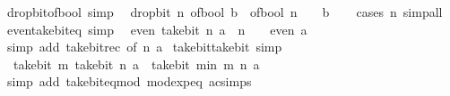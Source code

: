 \begin{isabellebody}
\ drop{\isacharunderscore}{\kern0pt}bit{\isacharunderscore}{\kern0pt}of{\isacharunderscore}{\kern0pt}bool\ {\isacharbrackleft}{\kern0pt}simp{\isacharbrackright}{\kern0pt}{\isacharcolon}{\kern0pt}\isanewline
\ \ {\isachardoublequoteopen}drop{\isacharunderscore}{\kern0pt}bit\ n\ {\isacharparenleft}{\kern0pt}of{\isacharunderscore}{\kern0pt}bool\ b{\isacharparenright}{\kern0pt}\ {\isacharequal}{\kern0pt}\ of{\isacharunderscore}{\kern0pt}bool\ {\isacharparenleft}{\kern0pt}n\ {\isacharequal}{\kern0pt}\ {}\ {\isasymand}\ b{\isacharparenright}{\kern0pt}{\isachardoublequoteclose}\isanewline
%
\isadelimproof
\ \ %
\endisadelimproof
%
\isatagproof
{}\isamarkupfalse%
\ {\isacharparenleft}{\kern0pt}cases\ n{\isacharparenright}{\kern0pt}\ simp{\isacharunderscore}{\kern0pt}all%
\endisatagproof
{\isafoldproof}%
%
\isadelimproof
\isanewline
%
\endisadelimproof
\isanewline
{}\isamarkupfalse%
\ even{\isacharunderscore}{\kern0pt}take{\isacharunderscore}{\kern0pt}bit{\isacharunderscore}{\kern0pt}eq\ {\isacharbrackleft}{\kern0pt}simp{\isacharbrackright}{\kern0pt}{\isacharcolon}{\kern0pt}\isanewline
\ \ {\isacartoucheopen}even\ {\isacharparenleft}{\kern0pt}take{\isacharunderscore}{\kern0pt}bit\ n\ a{\isacharparenright}{\kern0pt}\ {\isasymlongleftrightarrow}\ n\ {\isacharequal}{\kern0pt}\ {}\ {\isasymor}\ even\ a{\isacartoucheclose}\isanewline
%
\isadelimproof
\ \ %
\endisadelimproof
%
\isatagproof
{}\isamarkupfalse%
\ {\isacharparenleft}{\kern0pt}simp\ add{\isacharcolon}{\kern0pt}\ take{\isacharunderscore}{\kern0pt}bit{\isacharunderscore}{\kern0pt}rec\ {\isacharbrackleft}{\kern0pt}of\ n\ a{\isacharbrackright}{\kern0pt}{\isacharparenright}{\kern0pt}%
\endisatagproof
{\isafoldproof}%
%
\isadelimproof
\isanewline
%
\endisadelimproof
\isanewline
{}\isamarkupfalse%
\ take{\isacharunderscore}{\kern0pt}bit{\isacharunderscore}{\kern0pt}take{\isacharunderscore}{\kern0pt}bit\ {\isacharbrackleft}{\kern0pt}simp{\isacharbrackright}{\kern0pt}{\isacharcolon}{\kern0pt}\isanewline
\ \ {\isachardoublequoteopen}take{\isacharunderscore}{\kern0pt}bit\ m\ {\isacharparenleft}{\kern0pt}take{\isacharunderscore}{\kern0pt}bit\ n\ a{\isacharparenright}{\kern0pt}\ {\isacharequal}{\kern0pt}\ take{\isacharunderscore}{\kern0pt}bit\ {\isacharparenleft}{\kern0pt}min\ m\ n{\isacharparenright}{\kern0pt}\ a{\isachardoublequoteclose}\isanewline
%
\isadelimproof
\ \ %
\endisadelimproof
%
\isatagproof
{}\isamarkupfalse%
\ {\isacharparenleft}{\kern0pt}simp\ add{\isacharcolon}{\kern0pt}\ take{\isacharunderscore}{\kern0pt}bit{\isacharunderscore}{\kern0pt}eq{\isacharunderscore}{\kern0pt}mod\ mod{\isacharunderscore}{\kern0pt}exp{\isacharunderscore}{\kern0pt}eq\ ac{\isacharunderscore}{\kern0pt}simps{\isacharparenright}{\kern0pt}%

\end{isabellebody}
